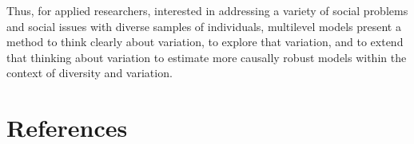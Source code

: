 \documentclass[
  letterpaper,
  DIV=11,
  numbers=noendperiod]{scrreprt}
\begin{document}
Thus, for applied researchers, interested in addressing a variety of
social problems and social issues with diverse samples of individuals,
multilevel models present a method to think clearly about variation, to
explore that variation, and to extend that thinking about variation to
estimate more causally robust models within the context of diversity and
variation. 


\chapter*{References}\label{references}

\end{document}
